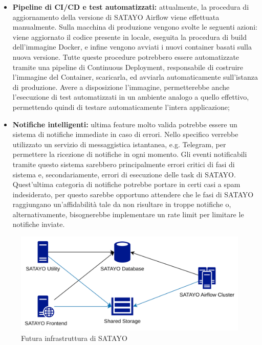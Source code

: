 \begin{itemize}
  \item \textbf{Pipeline di CI/CD e test automatizzati:} attualmente, la procedura
    di aggiornamento della versione di SATAYO Airflow viene effettuata manualmente.
    Sulla macchina di produzione vengono svolte le seguenti azioni: viene aggiornato
    il codice presente in locale, eseguita la procedura di build dell'immagine
    Docker, e infine vengono avviati i nuovi container basati sulla nuova versione.
    Tutte queste procedure potrebbero essere automatizzate tramite una pipeline
    di Continuous Deployment, responsabile di costruire l'immagine del Container,
    scaricarla, ed avviarla automaticamente sull'istanza di produzione. Avere a
    disposizione l'immagine, permetterebbe anche l'esecuzione di test automatizzati
    in un ambiente analogo a quello effettivo, permettendo quindi di testare
    automaticamente l'intera applicazione;

  \item \textbf{Notifiche intelligenti:} ultima feature molto valida potrebbe
    essere un sistema di notifiche immediate in caso di errori. Nello specifico verrebbe
    utilizzato un servizio di messaggistica istantanea, e.g. Telegram, per
    permettere la ricezione di notifiche in ogni momento. Gli eventi notificabili
    tramite questo sistema sarebbero principalmente errori critici di fasi di sistema
    e, secondariamente, errori di esecuzione delle task di SATAYO. Quest'ultima
    categoria di notifiche potrebbe portare in certi casi a spam indesiderato, per
    questo sarebbe opportuno attendere che le fasi di SATAYO raggiungano un'affidabilità
    tale da non risultare in troppe notifiche o, alternativamente, bisognerebbe implementare
    un rate limit per limitare le notifiche inviate.
\end{itemize}

\begin{figure}[htbp]
  \centering
  \includegraphics[width=.7\linewidth]{images/SATAYO_infrastructure_future.png}
  \caption{Futura infrastruttura di SATAYO}
  \label{fig:infra_future}
\end{figure}